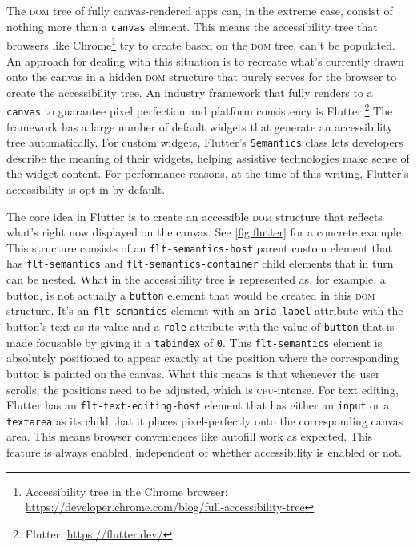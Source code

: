 \documentclass[sigconf]{acmart}
\begin{document}
 The \textsc{dom} tree of fully canvas-rendered apps can, in the extreme case, consist of nothing more than a \texttt{canvas} element. This means the accessibility tree that browsers like Chrome\footnote{Accessibility tree in the Chrome browser: \url{https://developer.chrome.com/blog/full-accessibility-tree}} try to create based on the \textsc{dom} tree, can't be populated. An approach for dealing with this situation is to recreate what's currently drawn onto the canvas in a hidden \textsc{dom} structure that purely serves for the browser to create the accessibility tree. An industry framework that fully renders to a \texttt{canvas} to guarantee pixel perfection and platform consistency is Flutter.\footnote{Flutter: \url{https://flutter.dev/}} The framework has a large number of default widgets that generate an accessibility tree automatically. For custom widgets, Flutter's \texttt{Semantics} class lets developers describe the meaning of their widgets, helping assistive technologies make sense of the widget content. For performance reasons, at the time of this writing, Flutter's accessibility is opt-in by default.
 
 The core idea in Flutter is to create an accessible \textsc{dom} structure that reflects what's right now displayed on the canvas. See \autoref{fig:flutter} for a concrete example. This structure consists of an \texttt{flt-semantics-host} parent custom element that has \texttt{flt-semantics} and \texttt{flt-semantics-container} child elements that in turn can be nested. What in the accessibility tree is represented as, for example, a button, is not actually a \texttt{button} element that would be created in this \textsc{dom} structure. It's an \texttt{flt-semantics} element with an \texttt{aria-label} attribute with the button's text as its value and a \texttt{role} attribute with the value of \texttt{button} that is made focusable by giving it a \texttt{tabindex} of \texttt{0}. This \texttt{flt-semantics} element is absolutely positioned to appear exactly at the position where the corresponding button is painted on the canvas. What this means is that whenever the user scrolls, the positions need to be adjusted, which is \textsc{cpu}-intense. For text editing, Flutter has an \texttt{flt-text-editing-host} element that has either an \texttt{input} or a \texttt{textarea} as its child that it places pixel-perfectly onto the corresponding canvas area. This means browser conveniences like autofill work as expected. This feature is always enabled, independent of whether accessibility is enabled or not.
\end{document}
